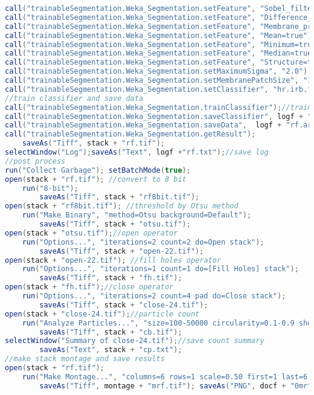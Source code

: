 \begin{lstlisting}[language=java, caption=Trainable segmentation on variable nest images., label=cd:threshold-variable-rf]
call("trainableSegmentation.Weka_Segmentation.setFeature", "Sobel_filter=false");
call("trainableSegmentation.Weka_Segmentation.setFeature", "Difference_of_gaussians=false");
call("trainableSegmentation.Weka_Segmentation.setFeature", "Membrane_projections=false");
call("trainableSegmentation.Weka_Segmentation.setFeature", "Mean=true");
call("trainableSegmentation.Weka_Segmentation.setFeature", "Minimum=true");
call("trainableSegmentation.Weka_Segmentation.setFeature", "Median=true");
call("trainableSegmentation.Weka_Segmentation.setFeature", "Structure=true");
call("trainableSegmentation.Weka_Segmentation.setMaximumSigma", "2.0");
call("trainableSegmentation.Weka_Segmentation.setMembranePatchSize", "1");
call("trainableSegmentation.Weka_Segmentation.setClassifier", "hr.irb.fastRandomForest.FastRandomForest", "-I 50 -K 2 -S -5571395");
//train classifier and save data
call("trainableSegmentation.Weka_Segmentation.trainClassifier");//train classifier
call("trainableSegmentation.Weka_Segmentation.saveClassifier", logf + "rf.model");//save classifier 
call("trainableSegmentation.Weka_Segmentation.saveData",  logf + "rf.arff");//save data 
call("trainableSegmentation.Weka_Segmentation.getResult"); 
	saveAs("Tiff", stack + "rf.tif");
selectWindow("Log");saveAs("Text", logf +"rf.txt");//save log 
//post process
run("Collect Garbage"); setBatchMode(true);
open(stack + "rf.tif"); //convert to 8 bit
	run("8-bit");
		saveAs("Tiff", stack + "rf8bit.tif"); 
open(stack + "rf8bit.tif"); //threshold by Otsu method
	run("Make Binary", "method=Otsu background=Default");
		saveAs("Tiff", stack + "otsu.tif"); 
open(stack + "otsu.tif");//open operator
	run("Options...", "iterations=2 count=2 do=Open stack");
		saveAs("Tiff", stack + "open-22.tif");
open(stack + "open-22.tif"); //fill holes operator
	run("Options...", "iterations=1 count=1 do=[Fill Holes] stack");
		saveAs("Tiff", stack + "fh.tif");
open(stack + "fh.tif");//close operator
	run("Options...", "iterations=2 count=4 pad do=Close stack");
		saveAs("Tiff", stack + "close-24.tif");
open(stack + "close-24.tif");//particle count
	run("Analyze Particles...", "size=100-50000 circularity=0.1-0.9 show=Outlines display clear summarize in_situ stack");
		saveAs("Tiff", stack + "cb.tif");
selectWindow("Summary of close-24.tif");//save count summary
		saveAs("Text", stack + "cp.txt");		
//make stack montage and save results
open(stack + "rf.tif");
	run("Make Montage...", "columns=6 rows=1 scale=0.50 first=1 last=6 increment=1 border=4 font=20 label use");
		saveAs("Tiff", montage + "mrf.tif"); saveAs("PNG", docf + "0mrf.png");

\end{lstlisting}
